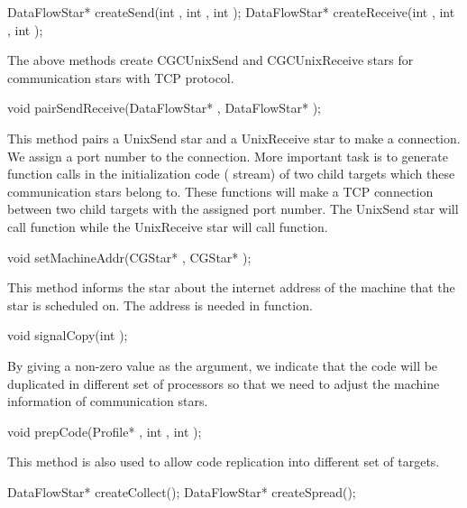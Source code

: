 {\begin{example}
DataFlowStar* createSend(int , int , int );
DataFlowStar* createReceive(int , int , int );
\end{example}

The above methods create CGCUnixSend and CGCUnixReceive stars for
communication stars with TCP protocol.

\begin{example}
void pairSendReceive(DataFlowStar* , DataFlowStar* );
\end{example}

This method pairs a UnixSend star and a UnixReceive star to make a
connection. We assign a port number to the connection. More important
task is to generate function calls in the initialization code (
stream) of two child targets which these communication stars belong to.
These functions will make a TCP connection between two child targets with
the assigned port number. The UnixSend star will call 
function while the UnixReceive star will call  function.

\begin{example}
void setMachineAddr(CGStar* , CGStar* );
\end{example}

This method informs the  star about the internet address of 
the machine that the  star is scheduled on. The address is needed in
 function. 

\begin{example}
void signalCopy(int );
\end{example}

By giving a non-zero value as the argument, we indicate that the code
will be duplicated in different set of processors so that we need to
adjust the machine information of communication stars.

\begin{example}
void prepCode(Profile* , int , int );
\end{example}

This method is also used to allow code replication into different set of
targets. 

\begin{example}
DataFlowStar* createCollect();
DataFlowStar* createSpread();
\end{example}

}
